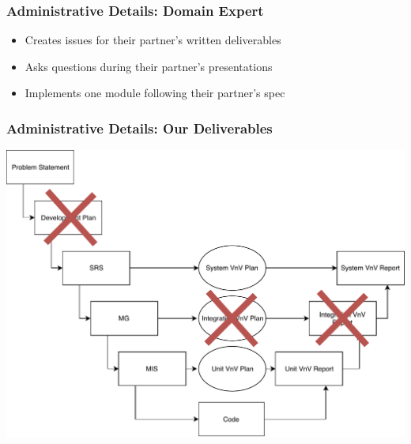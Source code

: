 \documentclass[t,12pt,numbers,fleqn]{beamer}
\begin{document}

\begin{frame}
\frametitle{Administrative Details: Domain Expert}

\begin {itemize}

\item Creates issues for their partner's written deliverables
\item Asks questions during their partner's presentations
\item Implements one module following their partner's spec

\end {itemize}

\end{frame}


\begin{frame}

\frametitle{Administrative Details: Our Deliverables}

\begin{center}
\includegraphics[scale=0.55]{../Figures/VModelOfProcessXOut.pdf}
\end{center}
\vspace{-1.0cm}

\end{frame}

\end{document}
